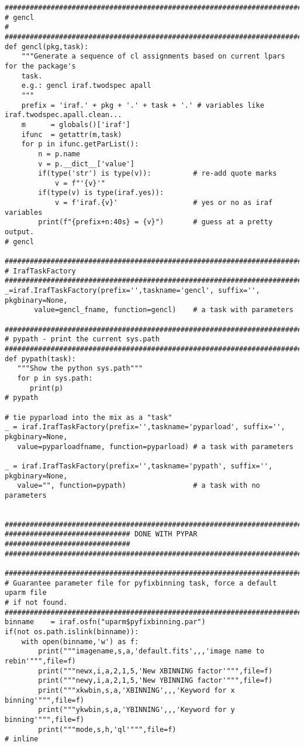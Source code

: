 {\begin{verbatim}
##############################################################################
# gencl
#
##############################################################################
def gencl(pkg,task):
    """Generate a sequence of cl assignments based on current lpars for the package's
    task.
    e.g.: gencl iraf.twodspec apall
    """
    prefix = 'iraf.' + pkg + '.' + task + '.' # variables like iraf.twodspec.apall.clean...
    m      = globals()['iraf']
    ifunc  = getattr(m,task)
    for p in ifunc.getParList():
        n = p.name
        v = p.__dict__['value']
        if(type('str') is type(v)):          # re-add quote marks
            v = f"'{v}'"
        if(type(v) is type(iraf.yes)):
            v = f'iraf.{v}'                  # yes or no as iraf variables
        print(f"{prefix+n:40s} = {v}")       # guess at a pretty output.
# gencl

#############################################################################
# IrafTaskFactory
#############################################################################
_=iraf.IrafTaskFactory(prefix='',taskname='gencl', suffix='', pkgbinary=None,
       value=gencl_fname, function=gencl)    # a task with parameters

#############################################################################
# pypath - print the current sys.path
#############################################################################
def pypath(task):
   """Show the python sys.path"""
   for p in sys.path:
      print(p)
# pypath

# tie pyparload into the mix as a "task"
_ = iraf.IrafTaskFactory(prefix='',taskname='pyparload', suffix='', pkgbinary=None,
   value=pyparloadfname, function=pyparload) # a task with parameters

_ = iraf.IrafTaskFactory(prefix='',taskname='pypath', suffix='', pkgbinary=None,
   value="", function=pypath)                # a task with no parameters


#############################################################################
############################## DONE WITH PYPAR ##############################
#############################################################################

#############################################################################
# Guarantee parameter file for pyfixbinning task, force a default uparm file
# if not found.
#############################################################################
binname    = iraf.osfn("uparm$pyfixbinning.par")
if(not os.path.islink(binname)):
    with open(binname,'w') as f:
        print("""imagename,s,a,'default.fits',,,'image name to rebin'""",file=f)
        print("""newx,i,a,2,1,5,'New XBINNING factor'""",file=f)
        print("""newy,i,a,2,1,5,'New YBINNING factor'""",file=f)
        print("""xkwbin,s,a,'XBINNING',,,'Keyword for x binning'""",file=f)
        print("""ykwbin,s,a,'YBINNING',,,'Keyword for y binning'""",file=f)
        print("""mode,s,h,'ql'""",file=f)
# inline


\end{verbatim}}

